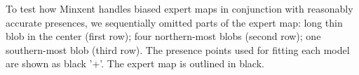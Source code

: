  To test how Minxent handles biased expert maps in conjunction with reasonably accurate presences, we sequentially omitted parts of the expert map: long thin blob in the center (first row); four northern-most blobs (second row); one southern-most blob (third row).  The presence points used for fitting each model are shown as black '+'. The expert map is outlined in black.